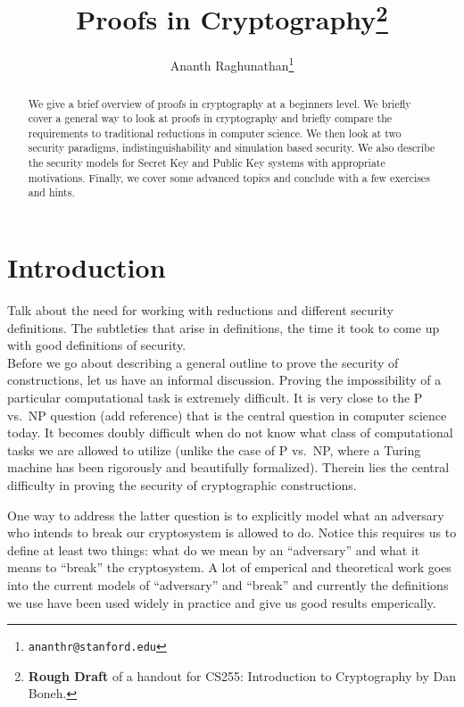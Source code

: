 \documentclass[A4, 11pt]{article}
\newcommand{\todo}[1]{\small{\sc #1}\normalsize \\}
\begin{document}
\title{Proofs in Cryptography\footnote{{\bf Rough Draft} of a handout for
CS255: Introduction to Cryptography by Dan Boneh.}}
\author{Ananth Raghunathan\thanks{{\tt ananthr@stanford.edu}}}
\date{}
\maketitle

\begin{abstract}
We give a brief overview of proofs in cryptography at a beginners level. We
briefly cover a general way to look at proofs in cryptography and briefly
compare the requirements to traditional reductions in computer science. We
then look at two security paradigms, indistinguishability and simulation
based security. We also describe the security models for Secret Key and
Public Key systems with appropriate motivations. Finally, we cover some
advanced topics and conclude with a few exercises and hints.
\end{abstract}

\section{Introduction}
\todo{Talk about the need for working with reductions and different security
definitions. The subtleties that arise in definitions, the time it took to
come up with good definitions of security.}

Before we go about describing a general outline to prove the security of
constructions, let us have an informal discussion. Proving the
impossibility of a particular computational task is extremely difficult. It
is very close to the P vs.~NP question (add reference) that is the central
question in computer science today. It becomes doubly difficult when do not
know what class of computational tasks we are allowed to utilize (unlike
the case of P vs.~NP, where a Turing machine has been rigorously and
beautifully formalized). Therein lies the central difficulty in proving the
security of cryptographic constructions. 

One way to address the latter question is to explicitly model what an
adversary who intends to break our cryptosystem is allowed to do. Notice
this requires us to define at least two things: what do we mean by an
``adversary'' and what it means to ``break'' the cryptosystem. A lot of
emperical and theoretical work goes into the current models of
``adversary'' and ``break'' and currently the definitions we use have been
used widely in practice and give us good results emperically. 
\end{document}
